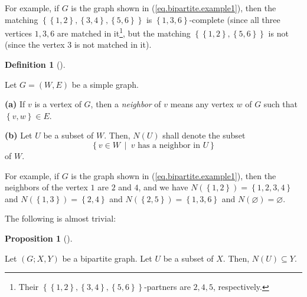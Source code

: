 \documentclass[numbers=enddot,12pt,final,onecolumn,notitlepage]{scrartcl}%
\theoremstyle{definition}
\newtheorem{prop}[theo]{Proposition}
\newenvironment{proposition}[1][]
{\begin{prop}[#1]\begin{leftbar}}
{\end{leftbar}\end{prop}}
\newtheorem{defi}[theo]{Definition}
\newenvironment{definition}[1][]
{\begin{defi}[#1]\begin{leftbar}}
{\end{leftbar}\end{defi}}
\begin{document}
For example, if $G$ is the graph shown in (\ref{eq.bipartite.example1}), then
the matching $\left\{  \left\{  1,2\right\}  ,\left\{  3,4\right\}  ,\left\{
5,6\right\}  \right\}  $ is $\left\{  1,3,6\right\}  $-complete (since all
three vertices $1,3,6$ are matched in it\footnote{Their $\left\{  \left\{
1,2\right\}  ,\left\{  3,4\right\}  ,\left\{  5,6\right\}  \right\}
$-partners are $2,4,5$, respectively.}, but the matching $\left\{  \left\{
1,2\right\}  ,\left\{  5,6\right\}  \right\}  $ is not (since the vertex $3$
is not matched in it).

\begin{definition}
Let $G=\left(  W,E\right)  $ be a simple graph.

\textbf{(a)} If $v$ is a vertex of $G$, then a \textit{neighbor} of $v$ means
any vertex $w$ of $G$ such that $\left\{  v,w\right\}  \in E$.

\textbf{(b)} Let $U$ be a subset of $W$. Then, $N\left(  U\right)  $ shall
denote the subset%
\[
\left\{  v\in W\ \mid\ v\text{ has a neighbor in }U\right\}
\]
of $W$.
\end{definition}

For example, if $G$ is the graph shown in (\ref{eq.bipartite.example1}), then
the neighbors of the vertex $1$ are $2$ and $4$, and we have $N\left(
\left\{  1,2\right\}  \right)  =\left\{  1,2,3,4\right\}  $ and $N\left(
\left\{  1,3\right\}  \right)  =\left\{  2,4\right\}  $ and $N\left(  \left\{
2,5\right\}  \right)  =\left\{  1,3,6\right\}  $ and $N\left(  \varnothing
\right)  =\varnothing$.

The following is almost trivial:

\begin{proposition}
\label{prop.bipartite.NXY}Let $\left(  G;X,Y\right)  $ be a bipartite graph.
Let $U$ be a subset of $X$. Then, $N\left(  U\right)  \subseteq Y$.
\end{proposition}
\end{document}
